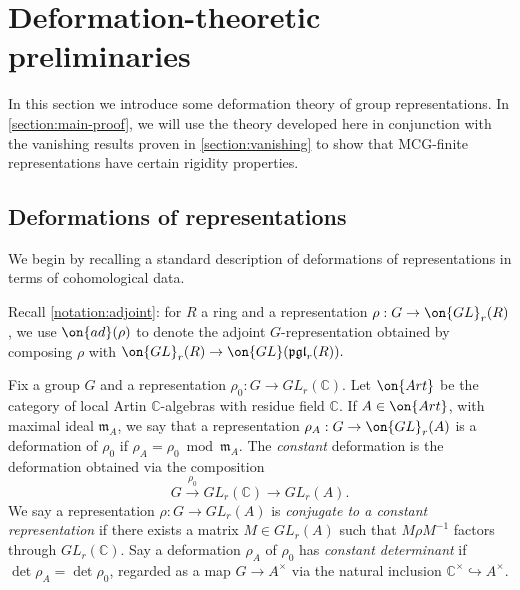 \documentclass[12 pt]{amsart}
\theoremstyle{plain}
\theoremstyle{definition}
\theoremstyle{remark}
\numberwithin{equation}{section}
\begin{document}
\section{Deformation-theoretic preliminaries}\label{section:deformation-theory}
In this section we introduce some deformation theory of group representations. In \autoref{section:main-proof}, we will use the theory developed here in conjunction with the vanishing results proven in \autoref{section:vanishing} to show that MCG-finite representations have certain rigidity properties.
\subsection{Deformations of representations}\label{subsection:deformation-basics}
We begin by recalling a standard description of deformations of representations in terms of cohomological data.

Recall 
\autoref{notation:adjoint}:
for $R$ a ring and a representation $\rho: G\to \on{GL}_r(R)$, we use $\on{ad}(\rho)$
to denote the adjoint $G$-representation obtained by composing $\rho$ with
$\on{GL}_r(R)\to \on{GL}(\mathfrak{pgl}_r(R)).$ 

Fix a group $G$ and a representation $\rho_0: G\to GL_r(\mathbb{C})$. Let $\on{Art}$ be the category of local Artin $\mathbb{C}$-algebras with residue field $\mathbb{C}$. If $A\in\on{Art}$, with
maximal ideal $\mathfrak{m}_A$, we say that a representation $\rho_A: G\to
\on{GL}_r(A)$ is a deformation of $\rho_0$ if $\rho_A=\rho_0 \bmod \mathfrak{m}_A$. The \emph{constant} deformation is the deformation obtained via the composition $$G\overset{\rho_0}{\to}GL_r(\mathbb{C})\to GL_r(A).$$ We say a representation $\rho: G\to GL_r(A)$ is \emph{conjugate to a constant representation} if there exists a matrix $M\in GL_r(A)$ such that $M\rho M^{-1}$ factors through $GL_r(\mathbb{C})$.
Say a deformation $\rho_A$ of $\rho_0$ has \emph{constant determinant} if $\det\rho_A=\det\rho_0$, regarded as a map $G\to A^\times$ via the natural inclusion $\mathbb{C}^\times\hookrightarrow A^\times$.
\end{document}
